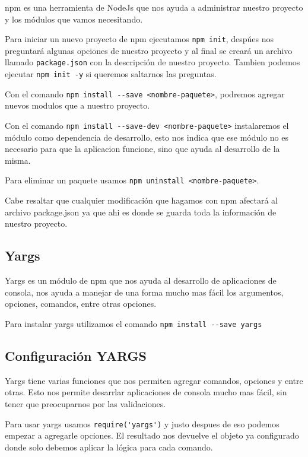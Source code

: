 \documentclass[12pt]{article}
\begin{document}
npm es una herramienta de NodeJs que nos ayuda a administrar nuestro proyecto y los módulos que vamos necesitando.

Para iniciar un nuevo proyecto de npm ejecutamos \colorbox{mygray}{\lstinline{npm init}}, despúes nos preguntará algunas opciones de nuestro proyecto y al final se creará un archivo llamado \lstinline{package.json} con la descripción de nuestro proyecto. Tambien podemos ejecutar \colorbox{mygray}{\lstinline{npm init -y}} si queremos saltarnos las preguntas.

Con el comando \colorbox{mygray}{\lstinline{npm install --save <nombre-paquete>}}, podremos agregar nuevos modulos que a nuestro proyecto.

Con el comando \colorbox{mygray}{\lstinline{npm install --save-dev <nombre-paquete>}} instalaremos el módulo como dependencia de desarrollo, esto nos indica que ese módulo no es necesario para que la aplicacion funcione, sino que ayuda al desarrollo de la misma.

Para eliminar un paquete usamos \colorbox{mygray}{\lstinline{npm uninstall <nombre-paquete>}}.

Cabe resaltar que cualquier modificación que hagamos con npm afectará al archivo package.json ya que ahi es donde se guarda toda la información de nuestro proyecto.

\subsection{Yargs}

Yargs es un módulo de npm que nos ayuda al desarrollo de aplicaciones de consola, nos ayuda a manejar de una forma mucho mas fácil los argumentos, opciones, comandos, entre otras opciones.

Para instalar yargs utilizamos el comando \colorbox{mygray}{\lstinline{npm install --save yargs}}

\subsection{Configuración YARGS}

Yargs tiene varias funciones que nos permiten agregar comandos, opciones y entre otras. Esto nos permite desarrlar aplicaciones de consola mucho mas fácil, sin tener que preocuparnos por las validaciones.

Para usar yargs usamos \lstinline{require('yargs')} y justo despues de eso podemos empezar a agregarle opciones. El resultado nos devuelve el objeto ya configurado donde solo debemos aplicar la lógica para cada comando.
\end{document}
